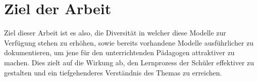 \section{Ziel der Arbeit}

Ziel dieser Arbeit ist es also, die Diversität in welcher diese Modelle zur Verfügung stehen zu erhöhen, sowie bereits vorhandene Modelle ausführlicher zu dokumentieren, um jene für den unterrichtenden Pädagogen attraktiver zu machen.
Dies zielt auf die Wirkung ab, den Lernprozess der Schüler effektiver zu gestalten und ein tiefgehenderes Verständnis des Themas zu erreichen.